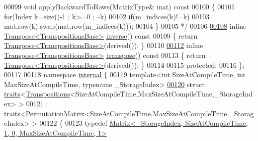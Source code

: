 \begin{DoxyCode}
00099 \textcolor{comment}{    void applyBackwardToRows(MatrixType& mat) const}
00100 \textcolor{comment}{    \{}
00101 \textcolor{comment}{      for(Index k=size()-1 ; k>=0 ; --k)}
00102 \textcolor{comment}{        if(m\_indices(k)!=k)}
00103 \textcolor{comment}{          mat.row(k).swap(mat.row(m\_indices(k)));}
00104 \textcolor{comment}{    \}}
00105 \textcolor{comment}{    */}
00106 
\hyperlink{class_eigen_1_1_transpositions_base_affcac2f2ebcd5a8bf9067e20d3681d78}{00108}     \textcolor{keyword}{inline} \hyperlink{group___core___module_class_eigen_1_1_transpose}{Transpose<TranspositionsBase>} \hyperlink{class_eigen_1_1_transpositions_base_affcac2f2ebcd5a8bf9067e20d3681d78}{inverse}()\textcolor{keyword}{ const}
00109 \textcolor{keyword}{    }\{ \textcolor{keywordflow}{return} \hyperlink{group___core___module_class_eigen_1_1_transpose}{Transpose<TranspositionsBase>}(derived()); \}
00110 
\hyperlink{class_eigen_1_1_transpositions_base_a2ddede41421797738fc58ee1074efb8f}{00112}     \textcolor{keyword}{inline} \hyperlink{group___core___module_class_eigen_1_1_transpose}{Transpose<TranspositionsBase>} \hyperlink{class_eigen_1_1_transpositions_base_a2ddede41421797738fc58ee1074efb8f}{transpose}()\textcolor{keyword}{ const}
00113 \textcolor{keyword}{    }\{ \textcolor{keywordflow}{return} \hyperlink{group___core___module_class_eigen_1_1_transpose}{Transpose<TranspositionsBase>}(derived()); \}
00114 
00115   \textcolor{keyword}{protected}:
00116 \};
00117 
00118 \textcolor{keyword}{namespace }\hyperlink{namespaceinternal}{internal} \{
00119 \textcolor{keyword}{template}<\textcolor{keywordtype}{int} SizeAtCompileTime, \textcolor{keywordtype}{int} MaxSizeAtCompileTime, \textcolor{keyword}{typename} \_StorageIndex>
\hyperlink{struct_eigen_1_1internal_1_1traits_3_01_transpositions_3_01_size_at_compile_time_00_01_max_size_a3e3a58d21bfa7053a385355887ee81d}{00120} \textcolor{keyword}{struct }\hyperlink{struct_eigen_1_1internal_1_1traits}{traits}<\hyperlink{group___core___module_class_eigen_1_1_transpositions}{Transpositions}<SizeAtCompileTime,MaxSizeAtCompileTime,\_StorageIndex> >
00121  : \hyperlink{struct_eigen_1_1internal_1_1traits}{traits}<PermutationMatrix<SizeAtCompileTime,MaxSizeAtCompileTime,\_StorageIndex> >
00122 \{
00123   \textcolor{keyword}{typedef} 
      \hyperlink{group___core___module_class_eigen_1_1_matrix}{Matrix<\_StorageIndex, SizeAtCompileTime, 1, 0, MaxSizeAtCompileTime, 1>}

\end{DoxyCode}
